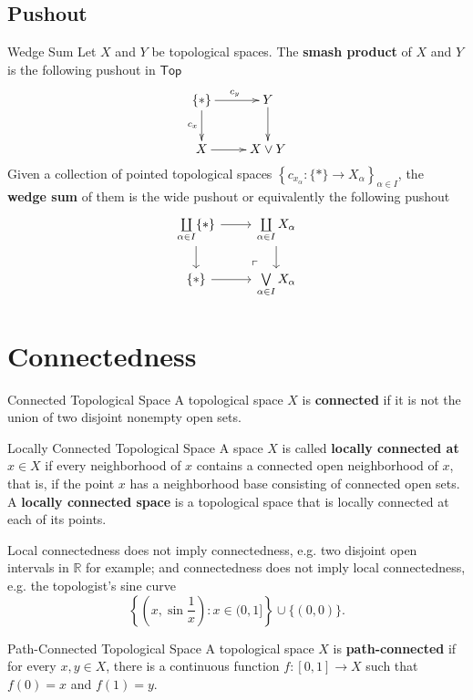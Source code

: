 \documentclass{report}
\newcommand{\Top}{\mathsf{Top}}
\begin{document}
\subsection{Pushout}


\begin{definition}{Wedge Sum}{}
	Let $X$ and $Y$ be topological spaces. The \textbf{smash product} of $X$ and $Y$ is the following pushout in $\Top$
	\[\xymatrix{
			\{*\}\ar[r]^{c_y}\ar[d]_{c_x}  &Y\ar[d]_{}\\
			X\ar@{->}[r]_{}&X\vee Y
		}\]
	Given a collection of pointed topological spaces $\left\{c_{x_\alpha}:\{*\}\to X_\alpha\right\}_{\alpha\in I}$, the \textbf{wedge sum} of them is the wide pushout or equivalently the following pushout
	\[
		\begin{tikzcd}[ampersand replacement=\&]
			\coprod\limits_{\alpha\in I} \{*\} \arrow[r] \arrow[d] \& \coprod\limits_{\alpha\in I} X_{\alpha} \arrow[d] \\
			\{*\} \arrow[r] \& \bigvee\limits_{\alpha\in I} X_\alpha \arrow[ul, phantom, "\ulcorner", very near start]
		\end{tikzcd}
	\]
\end{definition}



\section{Connectedness}
\begin{definition}{Connected Topological Space}{}
	A topological space $X$ is \textbf{connected} if it is not the union of two disjoint nonempty open sets.
\end{definition}

\begin{definition}{Locally Connected Topological Space}{}
	A space $X$ is called \textbf{locally connected at $x\in X$} if every neighborhood of $x$ contains a connected open neighborhood of $x$, that is, if the point $x$ has a neighborhood base consisting of connected open sets. A \textbf{locally connected space} is a topological space that is locally connected at each of its points.
\end{definition}

Local connectedness does not imply connectedness, e.g. two disjoint open intervals in $\mathbb {R}$ for example; and connectedness does not imply local connectedness, e.g. the topologist's sine curve $$\left\{\left(x, \sin \frac{1}{x}\right): x \in(0,1]\right\} \cup\{(0,0)\}.$$
\begin{definition}{Path-Connected Topological Space}{}
	A topological space $X$ is \textbf{path-connected} if for every $x,y\in X$, there is a continuous function $f:[0,1]\to X$ such that $f(0)=x$ and $f(1)=y$.
\end{definition}
\end{document}
